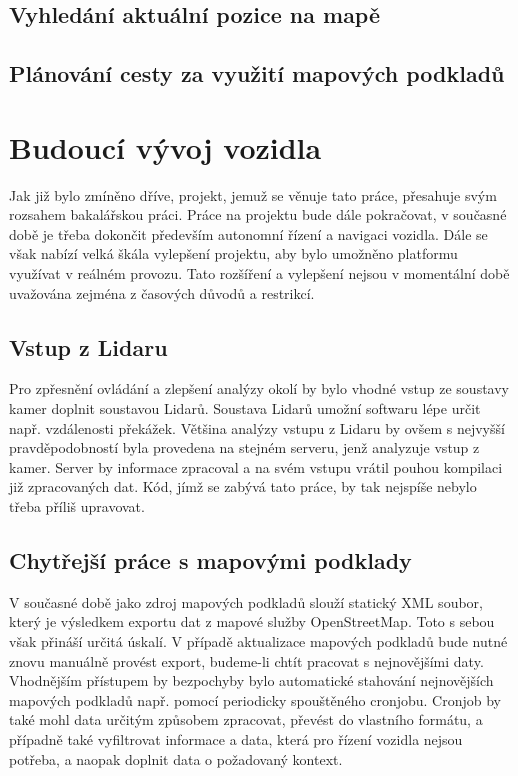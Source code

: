 \documentclass[czech, bachelor]{diploma}
\begin{document}
\section{Vyhledání aktuální pozice na mapě}

\section{Plánování cesty za využití mapových podkladů}

\chapter{Budoucí vývoj vozidla}

Jak již bylo zmíněno dříve, projekt, jemuž se věnuje tato práce, přesahuje svým rozsahem bakalářskou práci. Práce na projektu bude
dále pokračovat, v současné době je třeba dokončit především autonomní řízení a navigaci vozidla. Dále se však nabízí velká škála
vylepšení projektu, aby bylo umožněno platformu využívat v reálném provozu. Tato rozšíření a vylepšení nejsou v momentální době
uvažována zejména z časových důvodů a restrikcí.

\section{Vstup z Lidaru}

Pro zpřesnění ovládání a zlepšení analýzy okolí by bylo vhodné vstup ze soustavy kamer doplnit soustavou Lidarů. Soustava Lidarů
umožní softwaru lépe určit např. vzdálenosti překážek. Většina analýzy vstupu z Lidaru by ovšem s nejvyšší pravděpodobností byla
provedena na stejném serveru, jenž analyzuje vstup z kamer. Server by informace zpracoval a na svém vstupu vrátil pouhou kompilaci
již zpracovaných dat. Kód, jímž se zabývá tato práce, by tak nejspíše nebylo třeba příliš upravovat.

\section{Chytřejší práce s mapovými podklady}

V současné době jako zdroj mapových podkladů slouží statický XML soubor, který je výsledkem exportu dat z mapové služby 
OpenStreetMap. Toto s sebou však přináší určitá úskalí. V případě aktualizace mapových podkladů bude nutné znovu manuálně provést
export, budeme-li chtít pracovat s nejnovějšími daty. Vhodnějším přístupem by bezpochyby bylo automatické stahování nejnovějších
mapových podkladů např. pomocí periodicky spouštěného cronjobu. Cronjob by také mohl data určitým způsobem zpracovat, převést 
do vlastního formátu, a případně také vyfiltrovat informace a data, která pro řízení vozidla nejsou potřeba, a naopak doplnit data
o požadovaný kontext.
\end{document}
